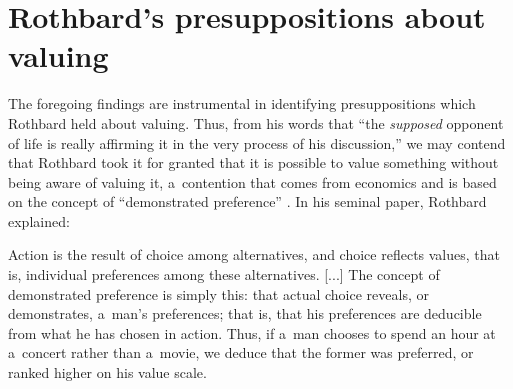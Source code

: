 \section{Rothbard's presuppositions about valuing}

The foregoing findings are instrumental in identifying presuppositions which Rothbard held about valuing. Thus, from his words that ``the \textit{supposed} opponent of life is really affirming it in the very process of his discussion,'' we may contend that Rothbard took it for granted that it is possible to value something without being aware of valuing it, a~contention that comes from economics and is based on the concept of ``demonstrated preference'' 
\parencite[cf.][p.61]{}. %
 In his seminal paper, Rothbard 
\parencite*[][p.289]{} %
 explained:



Action is the result of choice among alternatives, and choice reflects values, that is, individual preferences among these alternatives. [...] The concept of demonstrated preference is simply this: that actual choice reveals, or demonstrates, a~man's preferences; that is, that his preferences are deducible from what he has chosen in action. Thus, if a~man chooses to spend an hour at a~concert rather than a~movie, we deduce that the former was preferred, or ranked higher on his value scale.



